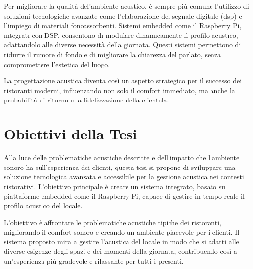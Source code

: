 Per migliorare la qualità del'ambiente acustico, è sempre più comune l'utilizzo di soluzioni tecnologiche avanzate come l'elaborazione del segnale digitale (\gls{dsp}) e l'impiego di materiali fonoassorbenti. Sistemi embedded come il Raspberry Pi, integrati con DSP, consentono di modulare dinamicamente il profilo acustico, adattandolo alle diverse necessità della giornata. Questi sistemi permettono di ridurre il rumore di fondo e di migliorare la chiarezza del parlato, senza compromettere l'estetica del luogo. 

La progettazione acustica diventa così un aspetto strategico per il successo dei ristoranti moderni, influenzando non solo il comfort immediato, ma anche la probabilità di ritorno e la fidelizzazione della clientela.

\section{Obiettivi della Tesi}
\noindent

Alla luce delle problematiche acustiche descritte e dell'impatto che l'ambiente sonoro ha sull'esperienza dei clienti, questa tesi si propone di sviluppare una soluzione tecnologica avanzata e accessibile per la gestione acustica nei contesti ristorativi. L'obiettivo principale è creare un sistema integrato, basato su piattaforme embedded come il Raspberry Pi, capace di gestire in tempo reale il profilo acustico del locale.

L'obiettivo è affrontare le problematiche acustiche tipiche dei ristoranti, migliorando il comfort sonoro e creando un ambiente piacevole per i clienti. Il sistema proposto mira a gestire l'acustica del locale in modo che si adatti alle diverse esigenze degli spazi e dei momenti della giornata, contribuendo così a un'esperienza più gradevole e rilassante per tutti i presenti.